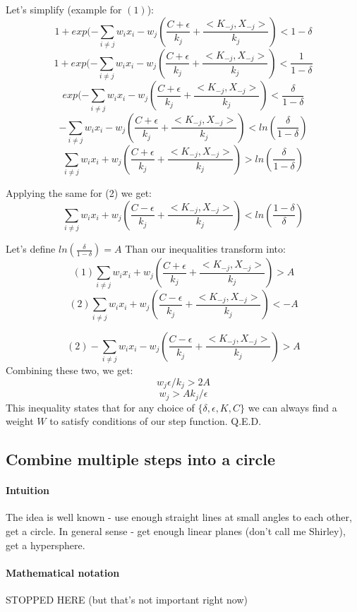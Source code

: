 \documentclass{article}
\begin{document}
Let's simplify (example for $(1)$):
$$1 + exp(- \sum_{i \neq j}w_ix_i - w_j (\frac{C + \epsilon}{k_j} + \frac{<K_{-j} , X_{-j}>}{k_j}) < 1-\delta$$
$$1 + exp(- \sum_{i \neq j}w_ix_i - w_j (\frac{C + \epsilon}{k_j} + \frac{<K_{-j} , X_{-j}>}{k_j}) < \frac{1}{1-\delta}$$
$$exp(- \sum_{i \neq j}w_ix_i - w_j (\frac{C + \epsilon}{k_j} + \frac{<K_{-j} , X_{-j}>}{k_j}) < \frac{\delta}{1-\delta}$$
$$- \sum_{i \neq j}w_ix_i - w_j (\frac{C + \epsilon}{k_j} + \frac{<K_{-j} , X_{-j}>}{k_j}) < ln(\frac{\delta}{1-\delta})$$
$$\sum_{i \neq j}w_ix_i + w_j (\frac{C + \epsilon}{k_j} + \frac{<K_{-j} , X_{-j}>}{k_j}) > ln(\frac{\delta}{1-\delta})$$

Applying the same for (2) we get:
$$\sum_{i \neq j}w_ix_i + w_j (\frac{C - \epsilon}{k_j} + \frac{<K_{-j} , X_{-j}>}{k_j}) < ln(\frac{1-\delta}{\delta})$$

Let's define $ln(\frac{\delta}{1-\delta}) = A$
Than our inequalities transform into:
$$(1)\sum_{i \neq j}w_ix_i + w_j (\frac{C + \epsilon}{k_j} + \frac{<K_{-j} , X_{-j}>}{k_j}) > A $$
$$(2)\sum_{i \neq j}w_ix_i + w_j (\frac{C - \epsilon}{k_j} + \frac{<K_{-j} , X_{-j}>}{k_j}) < -A $$

$$(2) - \sum_{i \neq j}w_ix_i - w_j (\frac{C - \epsilon}{k_j} + \frac{<K_{-j} , X_{-j}>}{k_j}) > A $$
Combining these two, we get:
$$ w_j\epsilon/k_j > 2A$$
$$ w_j > A k_j/\epsilon$$
This inequality states that for any choice of $\{\delta, \epsilon, K, C\}$ we can always find a weight $W$ to satisfy conditions of our step function.
Q.E.D.

\subsection{Combine multiple steps into a circle}
\paragraph{Intuition}
The idea is well known - use enough straight lines at small angles to each other, get a circle.
In general sense - get enough linear planes (don't call me Shirley), get a hypersphere.

\paragraph{Mathematical notation}
STOPPED HERE (but that's not important right now)
\end{document}
